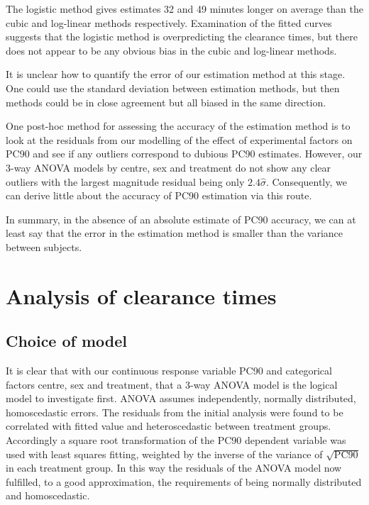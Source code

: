The logistic method gives estimates 32 and 49 minutes longer on average than the cubic and log-linear methods respectively. Examination of the fitted curves suggests that the logistic method is overpredicting the clearance times, but there does not appear to be any obvious bias in the cubic and log-linear methods.

It is unclear how to quantify the error of our estimation method at this stage. One could use the standard deviation between estimation methods, but then methods could be in close agreement but all biased in the same direction.

One post-hoc method for assessing the accuracy of the estimation method is to look at the residuals from our modelling of the effect of experimental factors on PC90 and see if any outliers correspond to dubious PC90 estimates. However, our 3-way ANOVA models by centre, sex and treatment do not show any clear outliers with the largest magnitude residual being only $2.4\hat{\sigma}$. Consequently, we can derive little about the accuracy of PC90 estimation via this route.

In summary, in the absence of an absolute estimate of PC90 accuracy, we can at least say that the error in the estimation method is smaller than the variance between subjects.
\section{Analysis of clearance times}
\subsection{Choice of model}
It is clear that with our continuous response variable PC90 and categorical factors centre, sex and treatment, that a 3-way ANOVA model is the logical model to investigate first. ANOVA assumes independently, normally distributed, homoscedastic 
errors. The residuals from the initial analysis were found to be correlated with fitted value and heteroscedastic between treatment groups. Accordingly a square root transformation of the PC90 dependent variable was used with least squares fitting, weighted by the inverse of the variance of $\sqrt{\mathrm{PC}90}$ in each treatment group. In this way the residuals of the ANOVA model now fulfilled, to a good approximation, the requirements of being normally distributed and homoscedastic.

